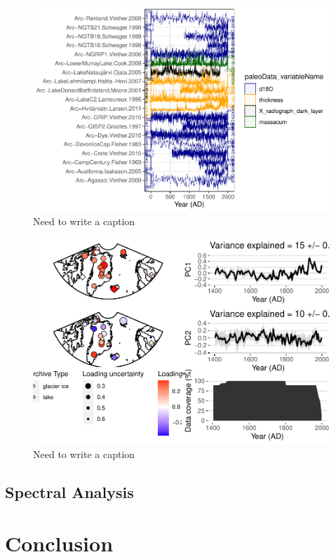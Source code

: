 \documentclass[gc, manuscript]{copernicus}
\begin{document}
\begin{figure}
\centering
\includegraphics{geoChronR-paper_files/figure-latex/unnamed-chunk-12-1.pdf}
\caption{\label{fig:unnamed-chunk-12}Need to write a caption}
\end{figure}

\begin{figure}
\centering
\includegraphics{geoChronR-paper_files/figure-latex/unnamed-chunk-14-1.pdf}
\caption{\label{fig:unnamed-chunk-14}Need to write a caption}
\end{figure}

\subsection{Spectral Analysis}

\section{Conclusion}
\end{document}
